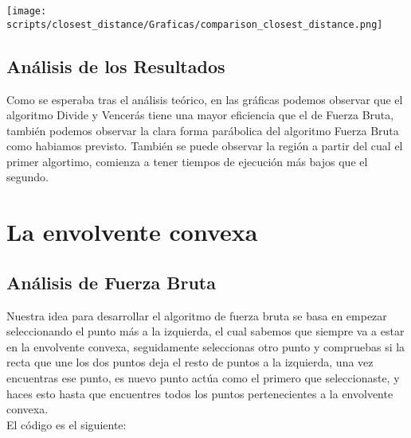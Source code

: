 \documentclass[a4paper,12pt]{article}
\begin{document}
\begin{center}
	\texttt{[image: scripts/closest\_distance/Graficas/comparison\_closest\_distance.png]}
\end{center}


\subsection{Análisis de los Resultados}
Como se esperaba tras el análisis teórico, en las gráficas podemos observar que el algoritmo Divide y Vencerás 
tiene una mayor eficiencia que el de Fuerza Bruta, también podemos observar la clara forma parábolica del algoritmo
Fuerza Bruta como habiamos previsto. También se puede observar la región a partir del cual el primer algortimo, comienza 
a tener tiempos de ejecución más bajos que el segundo.


\section{La envolvente convexa}
\subsection{Análisis de Fuerza Bruta}

Nuestra idea para desarrollar el algoritmo de fuerza bruta se basa en empezar seleccionando el punto más a la izquierda, 
el cual sabemos que siempre va a estar en la envolvente convexa, seguidamente seleccionas otro punto y compruebas si 
la recta que une los dos puntos deja el resto de puntos a la izquierda, una vez encuentras ese punto, es nuevo punto 
actúa como el primero que seleccionaste, y haces esto hasta que encuentres todos los puntos pertenecientes a la envolvente convexa. \\

El código es el siguiente:
\end{document}
